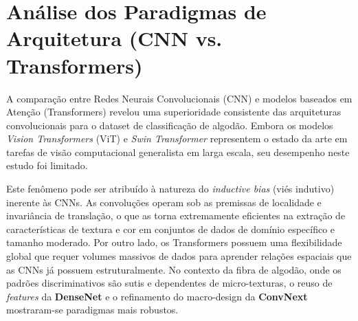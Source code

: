 \section{Análise dos Paradigmas de Arquitetura (CNN vs. Transformers)}

A comparação entre Redes Neurais Convolucionais (CNN) e modelos baseados em Atenção (Transformers) revelou uma superioridade consistente das arquiteturas convolucionais para o dataset de classificação de algodão. Embora os modelos \textit{Vision Transformers} (ViT) e \textit{Swin Transformer} representem o estado da arte em tarefas de visão computacional generalista em larga escala, seu desempenho neste estudo foi limitado.

Este fenômeno pode ser atribuído à natureza do \textit{inductive bias} (viés indutivo) inerente às CNNs. As convoluções operam sob as premissas de localidade e invariância de translação, o que as torna extremamente eficientes na extração de características de textura e cor em conjuntos de dados de domínio específico e tamanho moderado. Por outro lado, os Transformers possuem uma flexibilidade global que requer volumes massivos de dados para aprender relações espaciais que as CNNs já possuem estruturalmente. No contexto da fibra de algodão, onde os padrões discriminativos são sutis e dependentes de micro-texturas, o reuso de \textit{features} da \textbf{DenseNet} e o refinamento do macro-design da \textbf{ConvNext} mostraram-se paradigmas mais robustos.
